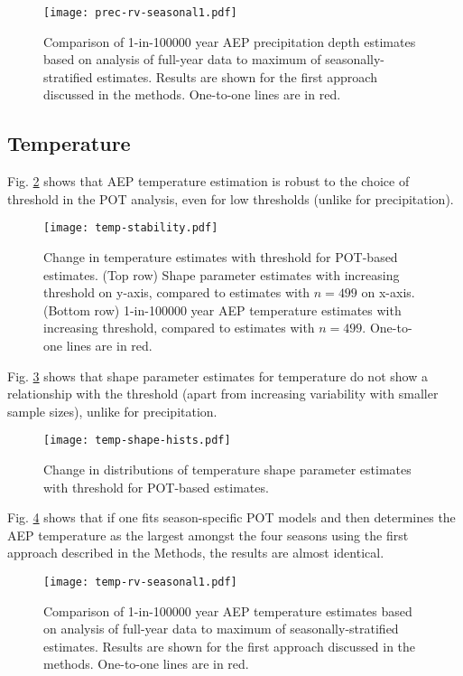 \documentclass{ametsocV6.1}
\begin{document}
\begin{figure}[H]
    \centering
    \texttt{[image: prec-rv-seasonal1.pdf]}
    \caption{Comparison of 1-in-100000 year AEP precipitation depth estimates based on analysis of full-year data to maximum of seasonally-stratified estimates. Results are shown for the first approach discussed in the methods. One-to-one lines are in red.}
    \label{fig:prec-rv-seasonal1}
\end{figure}

\subsection*{Temperature}

Fig. \ref{fig:temp-stability} shows that AEP temperature estimation is robust to the choice of threshold in the POT analysis, even for low thresholds (unlike for precipitation).

\begin{figure}[H]
    \centering
    \texttt{[image: temp-stability.pdf]}
    \caption{Change in temperature estimates with threshold for POT-based estimates. (Top row) Shape parameter estimates with increasing threshold on y-axis, compared to estimates with $n=499$ on x-axis. (Bottom row) 1-in-100000 year AEP temperature estimates with increasing threshold, compared to estimates with $n=499$. One-to-one lines are in red.}
    \label{fig:temp-stability}
\end{figure}

Fig. \ref{fig:temp-shape-hists} shows that shape parameter estimates for temperature do not show a relationship with the threshold (apart from increasing variability with smaller sample sizes), unlike for precipitation.

\begin{figure}[H]
    \centering
    \texttt{[image: temp-shape-hists.pdf]}
    \caption{Change in distributions of temperature shape parameter estimates with threshold for POT-based estimates.}
    \label{fig:temp-shape-hists}
\end{figure}

Fig. \ref{fig:temp-rv-seasonal1} shows that if one fits season-specific POT models and then determines the AEP temperature as the largest amongst the four seasons using the first approach described in the Methods, the results are almost identical.

\begin{figure}[H]
    \centering
    \texttt{[image: temp-rv-seasonal1.pdf]}
    \caption{Comparison of 1-in-100000 year AEP temperature estimates based on analysis of full-year data to maximum of seasonally-stratified estimates. Results are shown for the first approach discussed in the methods. One-to-one lines are in red.}
    \label{fig:temp-rv-seasonal1}
\end{figure}

\end{document}
